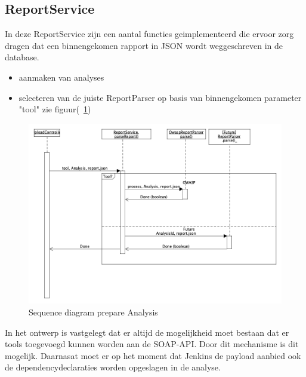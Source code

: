 \subsection{ReportService}\label{subsec:reportservice}


In deze ReportService zijn een aantal functies geimplementeerd die ervoor zorg dragen dat een binnengekomen rapport in JSON wordt weggeschreven in de database.
\begin{itemize}
    \item aanmaken van analyses %
    \item selecteren van de juiste ReportParser op basis van binnengekomen parameter "tool" zie figuur(~\ref{fig:analysisPrepare})
\end{itemize}

\begin{figure}[bth]
    \myfloatalign
    \includegraphics[width=14cm]{gfx/umlet/exports/SeqProcessPayload}
    \caption{Sequence diagram prepare Analysis}
    \label{fig:analysisPrepare}
\end{figure}

In het ontwerp is vastgelegt dat er altijd de mogelijkheid moet bestaan dat er tools toegevoegd kunnen worden aan de SOAP-API. Door dit mechanisme is dit mogelijk. Daarnasat moet er op het moment dat Jenkins de payload aanbied ook de dependencydeclaraties worden opgeslagen in de analyse.

